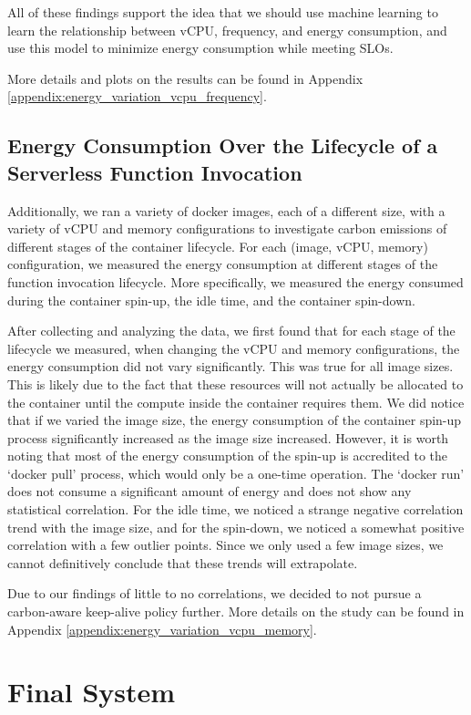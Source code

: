 \documentclass[times, 10pt,twocolumn]{article}
\begin{document}
All of these findings support the idea that we should use machine learning to learn the relationship between vCPU, frequency, and energy consumption, and use this model to minimize energy consumption while meeting SLOs.

More details and plots on the results can be found in Appendix \ref{appendix:energy_variation_vcpu_frequency}.

\subsection{Energy Consumption Over the Lifecycle of a Serverless Function Invocation}
Additionally, we ran a variety of docker images, each of a different size, with a variety of vCPU and memory configurations to investigate carbon emissions of different stages of the container lifecycle. For each (image, vCPU, memory) configuration, we measured the energy consumption at different stages of the function invocation lifecycle. More specifically, we measured the energy consumed during the container spin-up, the idle time, and the container spin-down.

After collecting and analyzing the data, we first found that for each stage of the lifecycle we measured, when changing the vCPU and memory configurations, the energy consumption did not vary significantly. This was true for all image sizes. This is likely due to the fact that these resources will not actually be allocated to the container until the compute inside the container requires them. We did notice that if we varied the image size, the energy consumption of the container spin-up process significantly increased as the image size increased. However, it is worth noting that most of the energy consumption of the spin-up is accredited to the `docker pull' process, which would only be a one-time operation. The `docker run' does not consume a significant amount of energy and does not show any statistical correlation. For the idle time, we noticed a strange negative correlation trend with the image size, and for the spin-down, we noticed a somewhat positive correlation with a few outlier points. Since we only used a few image sizes, we cannot definitively conclude that these trends will extrapolate.

Due to our findings of little to no correlations, we decided to not pursue a carbon-aware keep-alive policy further. More details on the study can be found in Appendix \ref{appendix:energy_variation_vcpu_memory}.

\section{Final System}
\end{document}
